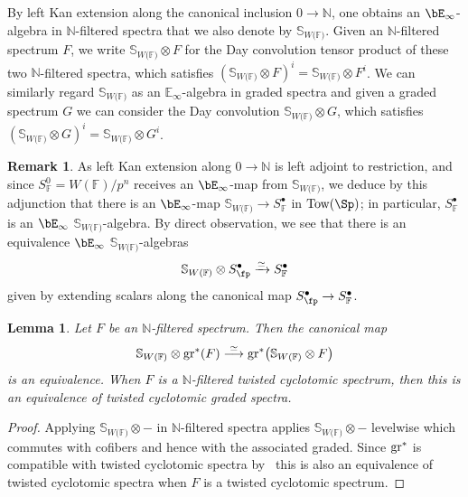\documentclass[english,10pt]{amsart}
\newcommand{\sphwf}{\mathbb{S}_{W(\mathbb{F)}}}
\newcommand{\field}{\mathbb{F}}
\newtheorem{lemm}{Lemma}[section]
\theoremstyle{definition}
\newtheorem{rema}{Remark}[section]
\numberwithin{equation}{section}
\newcommand{\Tow}{\mathrm{Tow}}
\newcommand{\N}{\mathbb{N}}
\newcommand{\gr}{\textup{gr}^*}
\begin{document}
By left Kan extension along the canonical inclusion $0 \to \mathbb{N}$, one obtains  an $\bE_\infty$-algebra in $\mathbb{N}$-filtered spectra that we also denote by $\sphwf$. Given an $\mathbb{N}$-filtered spectrum $F$, we write $\sphwf\otimes F$ for the Day convolution tensor product of these two $\mathbb{N}$-filtered spectra, which satisfies  $(\sphwf\otimes F)^i=\sphwf\otimes F^i$. We can similarly regard $\sphwf$ as an $\mathbb{E}_\infty$-algebra in graded spectra and given a graded spectrum $G$ we can consider the Day convolution $\sphwf\otimes G$, which satisfies $(\sphwf\otimes G)^i=\sphwf\otimes G^i$. 

\begin{rema}\label{rema base change for p adic filtration on the truncated witt}
As left Kan extension along $0\to \N$ is left adjoint to restriction, and since $S_{\field}^0 = W(\field)/p^n$ receives an $\bE_\infty$-map from $\sphwf$, we deduce by this adjunction that there is an $\bE_\infty$-map  $\sphwf \to S_{\field}^{\bullet}$ in $\Tow(\Sp)$; in particular, $S_{\field}^\bullet$ is an $\bE_\infty$ $\sphwf$-algebra. By direct observation, we see that there is an  equivalence  $\bE_\infty$ $\sphwf$-algebras
\begin{equation}\label{eq base change for p adic filtration}
\sphwf \otimes S_{\fp}^{\bullet} \xrightarrow{\simeq} S_{\field}^\bullet 
\end{equation}
given by extending scalars along the canonical map $S_{\fp}^{\bullet} \to S_{\field}^\bullet$.

\end{rema}
\begin{lemm}
Let $F$ be an $\mathbb{N}$-filtered spectrum. 
Then the canonical map
\begin{equation}\label{eq associated graded and sphwf otimes}
\sphwf \otimes \gr(F) \overset{\simeq}{\longrightarrow} \gr\big(\sphwf \otimes F\big) 
\end{equation}
is an equivalence. When $F$ is a $\mathbb{N}$-filtered twisted cyclotomic spectrum, then this is an equivalence of twisted cyclotomic graded spectra.
\end{lemm}
\begin{proof}
Applying $\sphwf \otimes -$ in $\N$-filtered spectra applies $\sphwf \otimes -$ levelwise which commutes with cofibers and hence with the associated graded. Since $\gr$ is compatible with twisted cyclotomic spectra by~\cite[Proposition~C.5.2]{hahn2020redshift} this is also an equivalence of twisted cyclotomic spectra when $F$ is a twisted cyclotomic spectrum. 
\end{proof}
\end{document}
